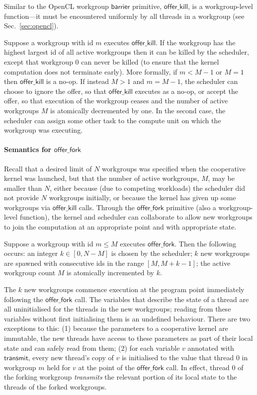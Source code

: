 \documentclass[numbers,nocopyrightspace,10pt]{sigplanconf}
\newcommand{\mysec}{Sec.~}
\newcommand{\transmit}{\mathsf{transmit}}
\newcommand{\offerfork}{\mathsf{offer\_fork}}
\newcommand{\offerkill}{\mathsf{offer\_kill}}
\begin{document}
Similar to the OpenCL workgroup $\mathsf{barrier}$ primitive,
$\offerkill$, is a workgroup-level function---it must be encountered
uniformly by all threads in a workgroup (see
\mysec\ref{sec:opencl}).

Suppose a workgroup with id $m$ executes $\offerkill$.  
If the workgroup has the highest largest id of all active workgroups then it can be killed by the scheduler, except that workgroup 0 can never be killed (to ensure that the kernel computation does not terminate early).  More formally, if $m < M-1$
or $M=1$ then $\offerkill$ is a no-op.  If instead $M > 1$ and $m =
M-1$, the scheduler can choose to ignore the offer, so that $\offerkill$
executes as a no-op, or accept the offer, so that execution of the workgroup ceases and
the number of active workgroups $M$ is atomically decremented by one.  In the second case, the scheduler can assign some other task to
the compute unit on which the workgroup was executing.


\paragraph{Semantics for $\offerfork$}

Recall that
a desired limit of $N$ workgroups was specified when the cooperative kernel was launched, but that the number of active workgroups, $M$, may be smaller
than $N$, either because (due to competing workloads) the scheduler
did not provide $N$ workgroups initially, or because the kernel has
given up some workgroups via $\offerkill$ calls.  Through the
$\offerfork$ primitive (also a workgroup-level function), the kernel and scheduler can collaborate to allow new
workgroups to join the computation at an appropriate point and with
appropriate state.

Suppose a workgroup with id $m\leq M$ executes $\offerfork$.  Then the following occurs: an
integer $k \in [0, N-M]$ is chosen by the scheduler;
$k$ new workgroups are spawned with consecutive ids in the range $[M,
  M+k-1]$; the active workgroup count $M$ is atomically incremented by $k$.

The $k$ new workgroups commence execution at the program point
immediately following the $\offerfork$ call.  The variables that
describe the state of a thread are all uninitialised for the threads
in the new workgroups; reading from these variables without first
initialising them is an undefined behaviour.  There are two exceptions
to this: (1) because the parameters to a cooperative kernel are
immutable, the new threads have access to these parameters as part of
their local state and can safely read from them; (2) for each variable
$v$ annotated with $\transmit$, every new thread's copy of $v$ is
initialised to the value that thread 0 in workgroup $m$ held for $v$
at the point of the $\offerfork$ call.
%
In effect, thread 0 of the forking workgroup \emph{transmits} the relevant
portion of its local state to the threads of the forked workgroups.
\end{document}

